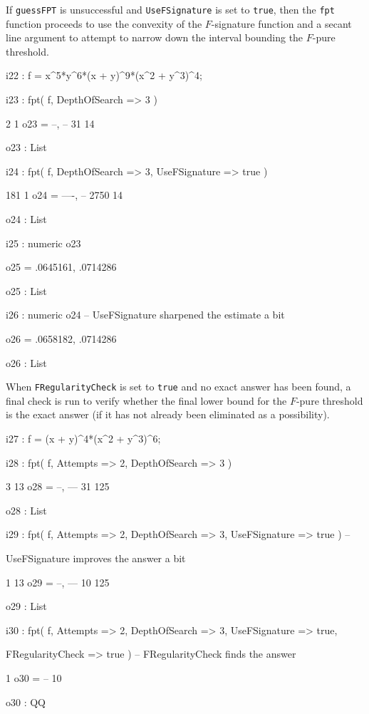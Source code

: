 \documentclass{amsart}
\begin{document}
If {\tt guessFPT} is unsuccessful and {\tt UseFSignature} is set to {\tt true}, then the {\tt fpt} function proceeds to use the convexity of the $F$-signature function and a secant line argument to attempt to narrow down the interval bounding the $F$-pure threshold.

{\small
{}
\begin{MyVerbatim}

i22 : f = x^5*y^6*(x + y)^9*(x^2 + y^3)^4;

i23 : fpt( f, DepthOfSearch => 3 )

        2   1
o23 = {--, --}
       31  14

o23 : List

i24 : fpt( f, DepthOfSearch => 3, UseFSignature => true )

        181   1
o24 = {----, --}
       2750  14

o24 : List

i25 : numeric o23

o25 = {.0645161, .0714286}

o25 : List

i26 : numeric o24 -- UseFSignature sharpened the estimate a bit

o26 = {.0658182, .0714286}

o26 : List

\end{MyVerbatim}
}

When {\tt FRegularityCheck} is set to {\tt true} and no exact answer has been found, a final check is run to verify whether the final lower bound for the $F$-pure threshold is the exact answer (if it has not already been eliminated as a possibility).

{\small
{}
\begin{MyVerbatim}

i27 : f = (x + y)^4*(x^2 + y^3)^6;

i28 : fpt( f, Attempts => 2, DepthOfSearch => 3 )

        3   13
o28 = {--, ---}
       31  125

o28 : List

i29 : fpt( f, Attempts => 2, DepthOfSearch => 3, UseFSignature => true ) -- 

      UseFSignature improves the answer a bit

        1   13
o29 = {--, ---}
       10  125

o29 : List

i30 : fpt( f, Attempts => 2, DepthOfSearch => 3, UseFSignature => true, 
 
      FRegularityCheck => true ) -- FRegularityCheck finds the answer

       1
o30 = --
      10

o30 : QQ

\end{MyVerbatim}
}
\end{document}
